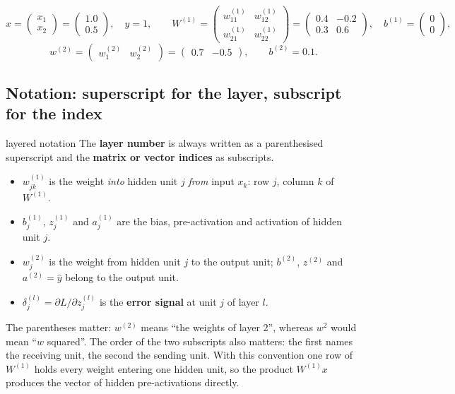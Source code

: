 \documentclass[11pt]{article}
\begin{document}
\[
x=\begin{pmatrix}x_1\\x_2\end{pmatrix}=\begin{pmatrix}1.0\\0.5\end{pmatrix},\quad y=1,\qquad
W^{(1)}=\begin{pmatrix}w^{(1)}_{11}&w^{(1)}_{12}\\[2pt]w^{(1)}_{21}&w^{(1)}_{22}\end{pmatrix}=\begin{pmatrix}0.4&-0.2\\0.3&0.6\end{pmatrix},\quad
b^{(1)}=\begin{pmatrix}0\\0\end{pmatrix},
\]
\[
w^{(2)}=\begin{pmatrix}w^{(2)}_1&w^{(2)}_2\end{pmatrix}=\begin{pmatrix}0.7&-0.5\end{pmatrix},\qquad b^{(2)}=0.1 .
\]

\subsection{Notation: superscript for the layer, subscript for the index}
\begin{definition}{layered notation}
The \textbf{layer number} is always written as a parenthesised superscript and the \textbf{matrix or vector indices} as subscripts.
\begin{itemize}
\item $w^{(1)}_{jk}$ is the weight \emph{into} hidden unit $j$ \emph{from} input $x_k$: row $j$, column $k$ of $W^{(1)}$.
\item $b^{(1)}_j$, $z^{(1)}_j$ and $a^{(1)}_j$ are the bias, pre-activation and activation of hidden unit $j$.
\item $w^{(2)}_j$ is the weight from hidden unit $j$ to the output unit; $b^{(2)}$, $z^{(2)}$ and $a^{(2)}=\hat y$ belong to the output unit.
\item $\delta^{(l)}_j=\partial L/\partial z^{(l)}_j$ is the \textbf{error signal} at unit $j$ of layer $l$.
\end{itemize}
\end{definition}
The parentheses matter: $w^{(2)}$ means ``the weights of layer 2'', whereas $w^2$ would mean ``$w$ squared''. The order of the two subscripts also matters: the first names the receiving unit, the second the sending unit. With this convention one row of $W^{(1)}$ holds every weight entering one hidden unit, so the product $W^{(1)}x$ produces the vector of hidden pre-activations directly.
\end{document}
